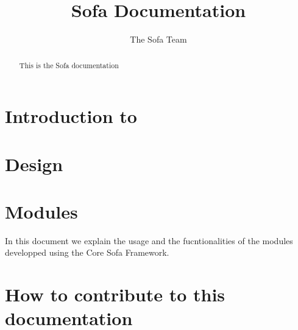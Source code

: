 \documentclass[a4paper,10pt]{report}
\title{Sofa Documentation}
\author{The Sofa Team}
\begin{document}
\maketitle

\begin{abstract}
This is the Sofa documentation
\end{abstract}

\tableofcontents

\chapter{Introduction to \sofa}
\graphicspath{{../introduction/}}  %


\chapter{Design}
\graphicspath{{../design/}}  %

\chapter{Modules}
\graphicspath{{../modules/}}  %
In this document we explain the usage and the fucntionalities of the modules developped using the Core Sofa Framework.

\chapter{How to contribute to this documentation}
\end{document}
